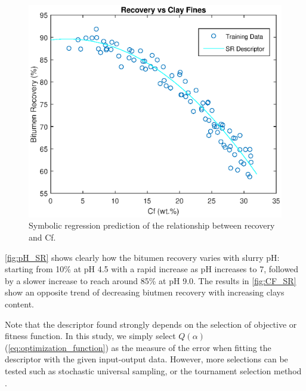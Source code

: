 \documentclass[final,5p,times,twocolumn]{elsarticle}
\begin{document}
\begin{figure}[!hptb]
	\centering
	\includegraphics[width=\linewidth,clip]{CF_SR.eps}
	\vspace{-2em}
	\caption{Symbolic regression prediction of the relationship between recovery and Cf.}
	\label{fig:CF_SR}
\end{figure}


\autoref{fig:pH_SR} shows clearly how the bitumen recovery varies with slurry pH: starting from 10\%  at pH 4.5 with a rapid increase as pH increases to 7, followed by a slower increase to reach around 85\%  at pH 9.0. The results in \autoref{fig:CF_SR} show an opposite trend of decreasing biutmen recovery with increasing clays content.

Note that the descriptor found strongly depends on the selection of objective or fitness function. In this study, we simply select $Q(\alpha)$ (\autoref{eq:optimization_function}) as the measure of the error when fitting the descriptor with the given input-output data. However, more selections can be tested such as stochastic universal sampling, or the tournament selection method \cite{whitley1994genetic,blickle1995mathematical}.
\end{document}
